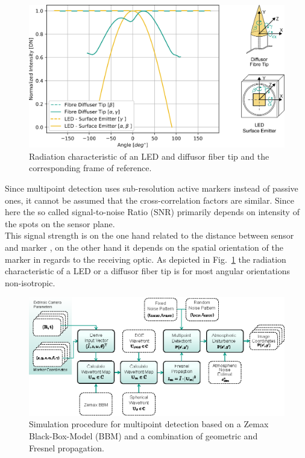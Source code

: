 \documentclass[5p,times,procedia]{elsarticle}
\begin{document}
\begin{figure}[!htb]
	\centering
	\includegraphics[width=0.9\linewidth]{graphics/ScatteringProfile_DiffuseFibreTip.eps}
	\caption{Radiation characteristic of an LED and diffusor fiber tip and the corresponding frame of reference.}
	\label{fig:scat_profile}
\end{figure}
%
Since multipoint detection \cite{Haist2015} uses sub-resolution active markers instead of passive ones, it cannot be assumed that the cross-correlation factors are similar. Since here the so called signal-to-noise Ratio (SNR) primarily depends on intensity of the spots on the sensor plane. \\
This signal strength is on the one hand related to the distance between sensor and marker \cite{dumbleton1955}, on the other hand it depends on the spatial orientation of the marker in regards to the receiving optic. As depicted in Fig.~\ref{fig:scat_profile}
the radiation characteristic of a LED or a diffusor fiber tip \cite{Pan1994} is for most angular orientations non-isotropic.\\
%
\begin{figure}[!htb]
	\centering
	\includegraphics[width=0.95\columnwidth]{graphics/OpticalSimulation.eps}
	\caption{Simulation procedure for multipoint detection based on a Zemax Black-Box-Model (BBM) and a combination of geometric and Fresnel propagation.}
	\label{fig:opto-sim}
\end{figure}
\end{document}
